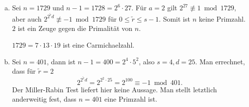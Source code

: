 
\begin{ex} \label{3.20}
	\begin{enumerate}[a)]
		\item
			Sei $n = 1729$ und $n - 1 = 1728 = 2^6 \cdot 27$.
			Für $a = 2$ gilt $2^{27} \not\equiv 1 \bmod 1729$, aber auch $2^{2^{\tilde r} d} \not\equiv -1 \bmod 1729$ für $0 \le \tilde r \le s-1$.
			Somit ist $n$ keine Primzahl.
			$2$ ist ein Zeuge gegen die Primalität von $n$.

			$1729 = 7 \cdot 13 \cdot 19$ ist eine Carmichaelzahl.
		\item
			Sei $n = 401$, dann ist $n - 1 = 400 = 2^4 \cdot 5^2$, also $s = 4, d = 25$.
			Man errechnet, dass für $\tilde r = 2$
			\[
				2^{2^{\tilde r} d} = 2^{2^2 \cdot 25} = 2^{100} \equiv -1 \bmod 401.
			\]
			Der Miller-Rabin Test liefert hier keine Aussage.
			Man stellt letztlich anderweitig fest, dass $n = 401$ eine Primzahl ist.
	\end{enumerate}
\end{ex}

